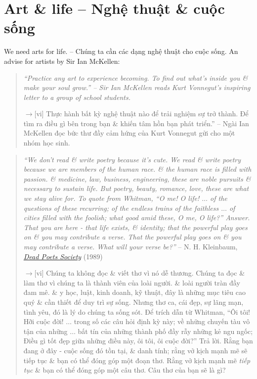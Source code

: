 \documentclass[12pt,twoside]{book}
\begin{document}
\section{Art \& life -- Nghệ thuật \& cuộc sống}
We need arts for life. -- Chúng ta cần các dạng nghệ thuật cho cuộc sống. An advise for artists by Sir {\sc Ian McKellen}:
\begin{quotation}
	{\it``Practice any art to experience becoming. To find out what's inside you \& make your soul grow.'' -- Sir {\sc Ian McKellen} reads {\sc Kurt Vonnegut}'s inspiring letter to a group of school students.}
	
	{\sf[en]$\to$[vi]} Thực hành bất kỳ nghệ thuật nào để trải nghiệm sự trở thành. Để tìm ra điều gì bên trong bạn \& khiến tâm hồn bạn phát triển.'' -- Ngài {\sc Ian McKellen} đọc bức thư đầy cảm hứng của {\sc Kurt Vonnegut} gửi cho một nhóm học sinh.
\end{quotation}

\begin{quotation}
	{\it``We don't read \& write poetry because it's cute. We read \& write poetry because we are members of the human race. \& the human race is filled with passion. \& medicine, law, business, engineering, these are noble pursuits \& necessary to sustain life. But poetry, beauty, romance, love, these are what we stay alive for. To quote from Whitman, ``O me! O life! $\ldots$ of the questions of these recurring; of the endless trains of the faithless $\ldots$ of cities filled with the foolish; what good amid these, O me, O life?'' Answer. That you are here - that life exists, \& identity; that the powerful play goes on \& you may contribute a verse. That the powerful play \emph{goes on} \& you may contribute a verse. What will your verse be?''} --  {\sc N. H. Kleinbaum}, \href{https://www.imdb.com/title/tt0097165}{\it Dead Poets Society} (1989)
	
	{\sf[en]$\to$[vi]} Chúng ta không đọc \& viết thơ vì nó dễ thương. Chúng ta đọc \& làm thơ vì chúng ta là thành viên của loài người. \& loài người tràn đầy đam mê. \& y học, luật, kinh doanh, kỹ thuật, đây là những mục tiêu cao quý \& cần thiết để duy trì sự sống. Nhưng thơ ca, cái đẹp, sự lãng mạn, tình yêu, đó là lý do chúng ta sống sót. Để trích dẫn từ Whitman, ``Ôi tôi! Hỡi cuộc đời! $\ldots$ trong số các câu hỏi định kỳ này; về những chuyến tàu vô tận của những $\ldots$ bất tín của những thành phố đầy rẫy những kẻ ngu ngốc; Điều gì tốt đẹp giữa những điều này, ôi tôi, ôi cuộc đời?'' Trả lời. Rằng bạn đang ở đây - cuộc sống đó tồn tại, \& danh tính; rằng vở kịch mạnh mẽ sẽ tiếp tục \& bạn có thể đóng góp một đoạn thơ. Rằng vở kịch mạnh mẽ \emph{tiếp tục} \& bạn có thể đóng góp một câu thơ. Câu thơ của bạn sẽ là gì?
\end{quotation}
\end{document}
